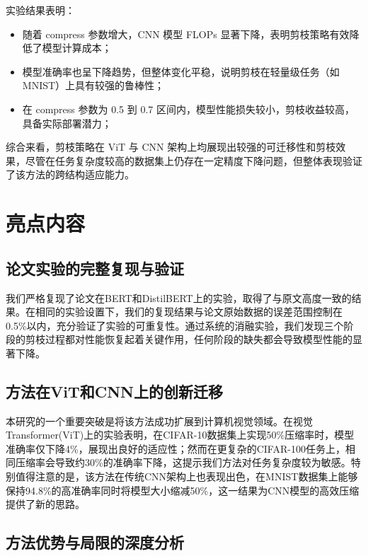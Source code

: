 \documentclass[UTF8,openany]{ctexbook}
\begin{document}
实验结果表明：

\begin{itemize}[itemsep=0pt, topsep=0pt, parsep=0pt, partopsep=0pt]
    \item 随着 compress 参数增大，CNN 模型 FLOPs 显著下降，表明剪枝策略有效降低了模型计算成本；
    \item 模型准确率也呈下降趋势，但整体变化平稳，说明剪枝在轻量级任务（如 MNIST）上具有较强的鲁棒性；
    \item 在 compress 参数为 0.5 到 0.7 区间内，模型性能损失较小，剪枝收益较高，具备实际部署潜力；
\end{itemize}

\vspace{1em}
综合来看，剪枝策略在 ViT 与 CNN 架构上均展现出较强的可迁移性和剪枝效果，尽管在任务复杂度较高的数据集上仍存在一定精度下降问题，但整体表现验证了该方法的跨结构适应能力。

\section{亮点内容}

\subsection{论文实验的完整复现与验证}

我们严格复现了论文在BERT和DistilBERT上的实验，取得了与原文高度一致的结果。在相同的实验设置下，我们的复现结果与论文原始数据的误差范围控制在0.5\%以内，充分验证了实验的可重复性。通过系统的消融实验，我们发现三个阶段的剪枝过程都对性能恢复起着关键作用，任何阶段的缺失都会导致模型性能的显著下降。

\subsection{方法在ViT和CNN上的创新迁移}

本研究的一个重要突破是将该方法成功扩展到计算机视觉领域。在视觉Transformer(ViT)上的实验表明，在CIFAR-10数据集上实现50\%压缩率时，模型准确率仅下降4\%，展现出良好的适应性；然而在更复杂的CIFAR-100任务上，相同压缩率会导致约30\%的准确率下降，这提示我们方法对任务复杂度较为敏感。特别值得注意的是，该方法在传统CNN架构上也表现出色，在MNIST数据集上能够保持94.8\%的高准确率同时将模型大小缩减50\%，这一结果为CNN模型的高效压缩提供了新的思路。

\subsection{方法优势与局限的深度分析}
\end{document}
